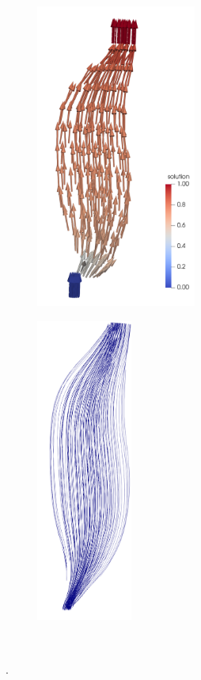 \begin{figure}%
  \centering%
  \begin{subfigure}[t]{0.49\textwidth}%
    \centering%
    \includegraphics[height=10cm]{images/fiber_creation/potential_flow.png}%
    \caption{}%
    \label{fig:potential_flow}%
  \end{subfigure}
  \begin{subfigure}[t]{0.49\textwidth}%
    \centering%
    \includegraphics[height=10cm]{images/fiber_creation/streamlines.png}%
    \caption{}%
    \label{fig:streamlines}%
  \end{subfigure}\\
  \caption{.}%
  \label{fig:potential_flow_streamlines}%
\end{figure}%
%

